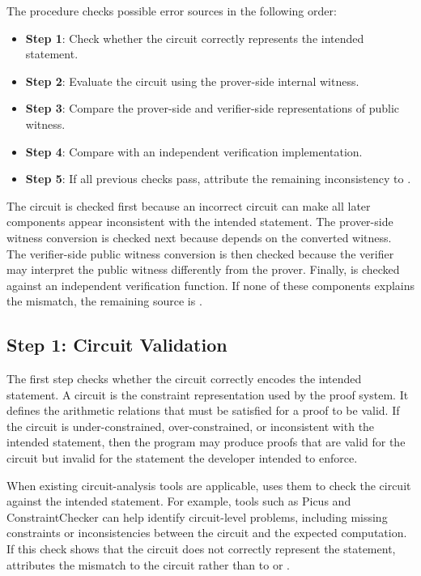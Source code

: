 The procedure checks possible error sources in the following order:

\begin{itemize}[leftmargin=*]
    \setlength{\itemsep}{0pt}
    \setlength{\parskip}{0pt}
    \item \textbf{Step 1}: Check whether the circuit correctly represents the intended statement.
    \item \textbf{Step 2}: Evaluate the circuit using the prover-side internal witness.
    \item \textbf{Step 3}: Compare the prover-side and verifier-side representations of public witness.
    \item \textbf{Step 4}: Compare \vfunc with an independent verification implementation.
    \item \textbf{Step 5}: If all previous checks pass, attribute the remaining inconsistency to \pfunc.
\end{itemize}

The circuit is checked first because an incorrect circuit can make all later components appear inconsistent with the intended statement. The prover-side witness conversion is checked next because \pfunc depends on the converted witness. The verifier-side public witness conversion is then checked because the verifier may interpret the public witness differently from the prover. Finally, \vfunc is checked against an independent verification function. If none of these components explains the mismatch, the remaining source is \pfunc.

\subsection{Step 1: Circuit Validation}
\label{subsec:greybox-locate_circuit}

The first step checks whether the circuit correctly encodes the intended statement. A circuit is the constraint representation used by the proof system. It defines the arithmetic relations that must be satisfied for a proof to be valid. If the circuit is under-constrained, over-constrained, or inconsistent with the intended statement, then the program may produce proofs that are valid for the circuit but invalid for the statement the developer intended to enforce.

When existing circuit-analysis tools are applicable, \greyboxfuzz uses them to check the circuit against the intended statement. For example, tools such as Picus \cite{pailoor2023automated} and ConstraintChecker \cite{fan2024snarkprobe} can help identify circuit-level problems, including missing constraints or inconsistencies between the circuit and the expected computation. If this check shows that the circuit does not correctly represent the statement, \greyboxfuzz attributes the mismatch to the circuit rather than to \pprog or \vprog.

